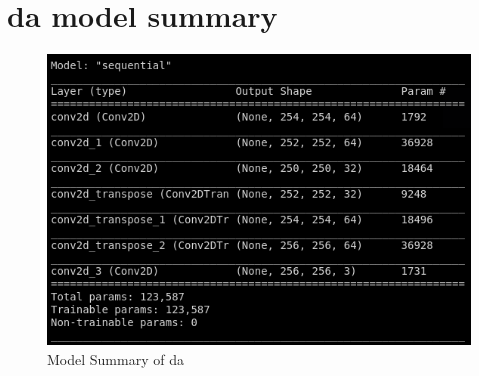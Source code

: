 \section{\gls{da} model summary}

\begin{figure}[H]
\centering
	\includegraphics[scale=0.7]{Figures/denoise_model_summary.png}	
	\caption{Model Summary of \acrlong{da}}
	\label{fig:denoise_model_summary}
\end{figure}

